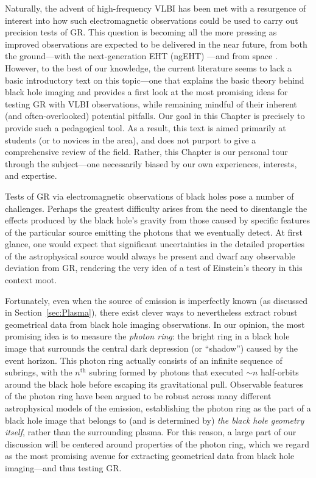 \documentclass[graybox,envcountchap]{svmult}
\begin{document}
Naturally, the advent of high-frequency VLBI has been met with a resurgence of interest into how such electromagnetic observations could be used to carry out precision tests of GR.
This question is becoming all the more pressing as improved observations are expected to be delivered in the near future, from both the ground---with the next-generation EHT (ngEHT) \cite{Johnson2023,Ayzenberg2023}---and from space \cite{Gurvits2022}.
However, to the best of our knowledge, the current literature seems to lack a basic introductory text on this topic---one that explains the basic theory behind black hole imaging and provides a first look at the most promising ideas for testing GR with VLBI observations, while remaining mindful of their inherent (and often-overlooked) potential pitfalls.
Our goal in this Chapter is precisely to provide such a pedagogical tool.
As a result, this text is aimed primarily at students (or to novices in the area), and does not purport to give a comprehensive review of the field.
Rather, this Chapter is our personal tour through the subject---one necessarily biased by our own experiences, interests, and expertise.

\bigskip

Tests of GR via electromagnetic observations of black holes pose a number of challenges.
Perhaps the greatest difficulty arises from the need to disentangle the effects produced by the black hole's gravity from those caused by specific features of the particular source emitting the photons that we eventually detect.
At first glance, one would expect that significant uncertainties in the detailed properties of the astrophysical source would always be present and dwarf any observable deviation from GR, rendering the very idea of a test of Einstein's theory in this context moot.

Fortunately, even when the source of emission is imperfectly known (as discussed in Section~\ref{sec:Plasma}), there exist clever ways to nevertheless extract robust geometrical data from black hole imaging observations.
In our opinion, the most promising idea is to measure the \emph{photon ring}: the bright ring in a black hole image that surrounds the central dark depression (or ``shadow'') caused by the event horizon. This photon ring actually consists of an infinite sequence of subrings, with the $n^\text{th}$ subring formed by photons that executed $\sim n$ half-orbits around the black hole before escaping its gravitational pull.
Observable features of the photon ring have been argued to be robust across many different astrophysical models of the emission, establishing the photon ring as the part of a black hole image that belongs to (and is determined by) \emph{the black hole geometry itself}, rather than the surrounding plasma.
For this reason, a large part of our discussion will be centered around properties of the photon ring, which we regard as the most promising avenue for extracting geometrical data from black hole imaging---and thus testing GR.
\end{document}
